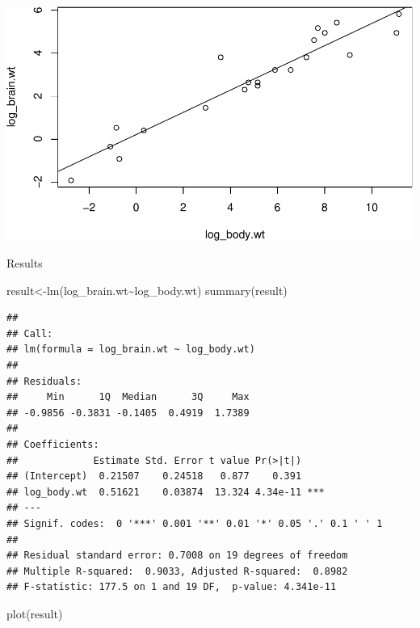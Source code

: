 \documentclass[
]{article}
\newenvironment{Shaded}{\begin{snugshade}}{\end{snugshade}}
\newcommand{\FunctionTok}[1]{\textcolor[rgb]{0.00,0.00,0.00}{#1}}
\newcommand{\NormalTok}[1]{#1}
\newcommand{\OtherTok}[1]{\textcolor[rgb]{0.56,0.35,0.01}{#1}}
\newcommand{\SpecialCharTok}[1]{\textcolor[rgb]{0.00,0.00,0.00}{#1}}
\begin{document}
\includegraphics{archosaur_files/figure-latex/unnamed-chunk-3-1.pdf}

Results

\begin{Shaded}
\begin{Highlighting}[]
\NormalTok{result}\OtherTok{\textless{}{-}}\FunctionTok{lm}\NormalTok{(log\_brain.wt}\SpecialCharTok{\textasciitilde{}}\NormalTok{log\_body.wt)}
\FunctionTok{summary}\NormalTok{(result)}
\end{Highlighting}
\end{Shaded}

\begin{verbatim}
## 
## Call:
## lm(formula = log_brain.wt ~ log_body.wt)
## 
## Residuals:
##     Min      1Q  Median      3Q     Max 
## -0.9856 -0.3831 -0.1405  0.4919  1.7389 
## 
## Coefficients:
##             Estimate Std. Error t value Pr(>|t|)    
## (Intercept)  0.21507    0.24518   0.877    0.391    
## log_body.wt  0.51621    0.03874  13.324 4.34e-11 ***
## ---
## Signif. codes:  0 '***' 0.001 '**' 0.01 '*' 0.05 '.' 0.1 ' ' 1
## 
## Residual standard error: 0.7008 on 19 degrees of freedom
## Multiple R-squared:  0.9033, Adjusted R-squared:  0.8982 
## F-statistic: 177.5 on 1 and 19 DF,  p-value: 4.341e-11
\end{verbatim}

\begin{Shaded}
\begin{Highlighting}[]
\FunctionTok{plot}\NormalTok{(result)}
\end{Highlighting}
\end{Shaded}
\end{document}
